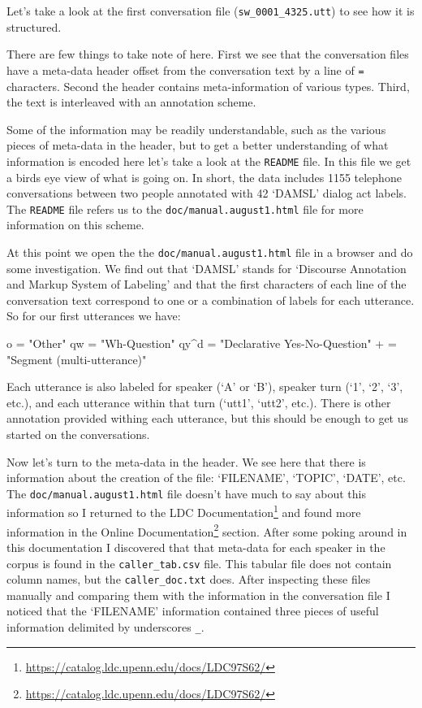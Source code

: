 \documentclass[
  letterpaper,
  DIV=11,
  numbers=noendperiod]{scrreport}
\newenvironment{Shaded}{\begin{snugshade}}{\end{snugshade}}
\newcommand{\NormalTok}[1]{\textcolor[rgb]{0.00,0.00,0.00}{#1}}
\theoremstyle{definition}
\theoremstyle{remark}
\DeclareRobustCommand{\href}[2]{#2\footnote{\url{#1}}}
\begin{document}
Let's take a look at the first conversation file
(\texttt{sw\_0001\_4325.utt}) to see how it is structured.

There are few things to take note of here. First we see that the
conversation files have a meta-data header offset from the conversation
text by a line of \texttt{=} characters. Second the header contains
meta-information of various types. Third, the text is interleaved with
an annotation scheme.

Some of the information may be readily understandable, such as the
various pieces of meta-data in the header, but to get a better
understanding of what information is encoded here let's take a look at
the \texttt{README} file. In this file we get a birds eye view of what
is going on. In short, the data includes 1155 telephone conversations
between two people annotated with 42 `DAMSL' dialog act labels. The
\texttt{README} file refers us to the \texttt{doc/manual.august1.html}
file for more information on this scheme.

At this point we open the the \texttt{doc/manual.august1.html} file in a
browser and do some investigation. We find out that `DAMSL' stands for
`Discourse Annotation and Markup System of Labeling' and that the first
characters of each line of the conversation text correspond to one or a
combination of labels for each utterance. So for our first utterances we
have:

\begin{Shaded}
\begin{Highlighting}[]
\NormalTok{o = "Other"}
\NormalTok{qw = "Wh{-}Question"}
\NormalTok{qy\^{}d = "Declarative Yes{-}No{-}Question"}
\NormalTok{+ = "Segment (multi{-}utterance)"}
\end{Highlighting}
\end{Shaded}

Each utterance is also labeled for speaker (`A' or `B'), speaker turn
(`1', `2', `3', etc.), and each utterance within that turn (`utt1',
`utt2', etc.). There is other annotation provided withing each
utterance, but this should be enough to get us started on the
conversations.

Now let's turn to the meta-data in the header. We see here that there is
information about the creation of the file: `FILENAME', `TOPIC', `DATE',
etc. The \texttt{doc/manual.august1.html} file doesn't have much to say
about this information so I returned to the
\href{https://catalog.ldc.upenn.edu/docs/LDC97S62/}{LDC Documentation}
and found more information in the
\href{https://catalog.ldc.upenn.edu/docs/LDC97S62/}{Online
Documentation} section. After some poking around in this documentation I
discovered that that meta-data for each speaker in the corpus is found
in the \texttt{caller\_tab.csv} file. This tabular file does not contain
column names, but the \texttt{caller\_doc.txt} does. After inspecting
these files manually and comparing them with the information in the
conversation file I noticed that the `FILENAME' information contained
three pieces of useful information delimited by underscores \texttt{\_}.
\end{document}
